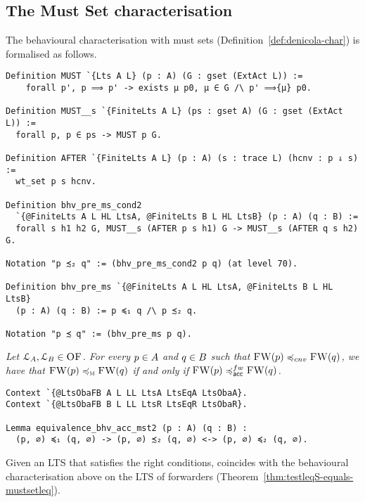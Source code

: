 \subsection{The Must Set characterisation}

The behavioural characterisation with must sets
(Definition~\ref{def:denicola-char}) is formalised as follows.

\begin{mdframed}
  \begin{verbatim}
Definition MUST `{Lts A L} (p : A) (G : gset (ExtAct L)) :=
    forall p', p ⟹ p' -> exists μ p0, μ ∈ G /\ p' ⟹{μ} p0.

Definition MUST__s `{FiniteLts A L} (ps : gset A) (G : gset (ExtAct L)) :=
  forall p, p ∈ ps -> MUST p G.

Definition AFTER `{FiniteLts A L} (p : A) (s : trace L) (hcnv : p ⇓ s) :=
  wt_set p s hcnv.

Definition bhv_pre_ms_cond2
  `{@FiniteLts A L HL LtsA, @FiniteLts B L HL LtsB} (p : A) (q : B) :=
  forall s h1 h2 G, MUST__s (AFTER p s h1) G -> MUST__s (AFTER q s h2) G.

Notation "p ≾₂ q" := (bhv_pre_ms_cond2 p q) (at level 70).

Definition bhv_pre_ms `{@FiniteLts A L HL LtsA, @FiniteLts B L HL LtsB}
  (p : A) (q : B) := p ≼₁ q /\ p ≾₂ q.

Notation "p ≾ q" := (bhv_pre_ms p q).
  \end{verbatim}
\end{mdframed}


\noindent
{}\emph{
Let $\mathcal{L}_A, \mathcal{L}_B \in \textsc{OF}$.
For every $p \in A$  and
$q \in B $ such that $\liftFW{ \serverA } \bhvleqone \liftFW{ \serverB }$,
we have that
$\textsc{FW}( p ) \preccurlyeq_{\textsc{m}} \textsc{FW}( q )$ if and only if
$\liftFW{ \serverA } \asleqAfw \liftFW{ \serverB }$.
}

\begin{mdframed}
\begin{verbatim}
Context `{@LtsObaFB A L LL LtsA LtsEqA LtsObaA}.
Context `{@LtsObaFB B L LL LtsR LtsEqR LtsObaR}.

Lemma equivalence_bhv_acc_mst2 (p : A) (q : B) :
  (p, ∅) ≼₁ (q, ∅) -> (p, ∅) ≾₂ (q, ∅) <-> (p, ∅) ≼₂ (q, ∅).
\end{verbatim}
\end{mdframed}

Given an LTS that satisfies the right conditions, \mustequivalence coincides
with the behavioural characterisation above on the LTS of forwarders
(Theorem~\ref{thm:testleqS-equals-mustsetleq}).

